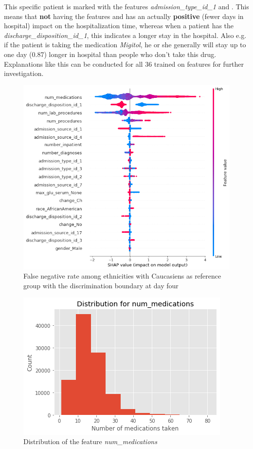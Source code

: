 \documentclass[journal]{IEEEtran}
\begin{document}
This specific patient is marked with the features \textit{admission\_type\_id\_1} and . This means that \textbf{not} having the features  and  has an actually \textbf{positive} (fewer days in hospital) impact on the hospitalization time, whereas when a patient has the \textit{discharge\_disposition\_id\_1}, this indicates a longer stay in the hospital. Also e.g. if the patient is taking the medication \textit{Migitol}, he or she generally will stay up to one day (0.87) longer in hospital than people who don't take this drug. Explanations like this can be conducted for all 36 trained on features for further investigation.

\begin{figure}
	\centering
	\includegraphics[width=1\linewidth]{../imgs/shap_paper}
	\caption{False negative rate among ethnicities with Caucasiens as reference group with the discrimination boundary at day four}
	\label{fig:shap}
\end{figure}

\begin{figure}
	\centering
	\includegraphics[width=0.9\linewidth]{../imgs/meds_dist}
	\caption{Distribution of the feature \textit{num\_medications}}
	\label{fig:num_meds}
\end{figure}
\end{document}
